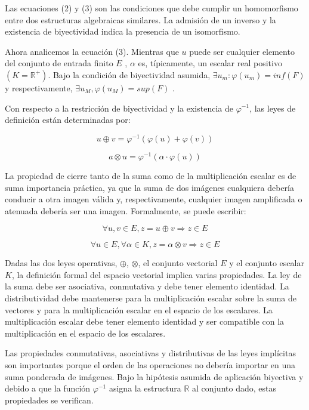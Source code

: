 Las ecuaciones (2) y (3) son las condiciones que debe cumplir un homomorfismo entre dos estructuras algebraicas similares. La admisi\'on de un inverso y la existencia de biyectividad indica la presencia de un isomorfismo.

Ahora analicemos la ecuación (3). Mientras que $u$ puede ser cualquier elemento del conjunto de entrada finito $E$ , $\alpha$ es, típicamente, un escalar real positivo $(K=\mathbb{R}^+)$. Bajo la condición de biyectividad asumida, $\exists u_m: \varphi( u_m ) = inf( F )$ y respectivamente, $\exists u_M , \varphi ( u_M ) = sup( F )$ .

Con respecto a la restricción de biyectividad y la existencia de $\varphi^{-1}$, las leyes de definición están determinadas por:

\begin{equation}
	u \oplus v = \varphi^{-1}(\varphi(u)+\varphi(v))	
\end{equation}

\begin{equation}	
	a \otimes u = \varphi^{-1}(\alpha\cdot\varphi(u))
\end{equation} 

La propiedad de cierre tanto de la suma como de la multiplicación escalar es de suma importancia práctica, ya que la suma de dos imágenes cualquiera debería conducir a otra imagen válida y, respectivamente, cualquier imagen amplificada o atenuada debería ser una imagen. Formalmente, se puede escribir:

\begin{equation}
	\forall u,v \in E, z = u \oplus v \Rightarrow z \in E
\end{equation}

\begin{equation}
	\forall u \in E, \forall \alpha \in K, z=\alpha \otimes v \Rightarrow z \in E
\end{equation}

Dadas las dos leyes operativas, $\oplus$, $\otimes$, el conjunto vectorial $E$ y el conjunto escalar $K$, la definición formal del espacio vectorial implica varias propiedades. La ley de la suma debe ser asociativa, conmutativa y debe tener elemento identidad. La distributividad debe mantenerse para la multiplicación escalar sobre la suma de vectores y para la multiplicación escalar en el espacio de los escalares. La multiplicación escalar debe tener elemento identidad y ser compatible con la multiplicación en el espacio de los escalares.

Las propiedades conmutativas, asociativas y distributivas de las leyes implícitas son importantes porque el orden de las operaciones no debería importar en una suma ponderada de imágenes. Bajo la hipótesis asumida de aplicación biyectiva y debido a que la función $\varphi^{-1}$ asigna la estructura $\mathbb{R}$ al conjunto dado, estas propiedades se verifican.

